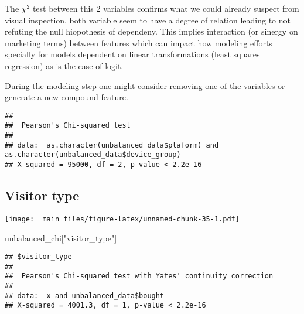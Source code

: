 \documentclass[
]{book}
\newenvironment{Shaded}{\begin{snugshade}}{\end{snugshade}}
\newcommand{\FunctionTok}[1]{\textcolor[rgb]{0.00,0.00,0.00}{#1}}
\newcommand{\NormalTok}[1]{#1}
\newcommand{\SpecialCharTok}[1]{\textcolor[rgb]{0.00,0.00,0.00}{#1}}
\newcommand{\StringTok}[1]{\textcolor[rgb]{0.31,0.60,0.02}{#1}}
\begin{document}
The \(\chi ^2\) test between this 2 variables confirms what we could already suspect from visual inspection, both variable seem to have a degree of relation leading to not refuting the null hiopothesis of dependeny. This implies interaction (or sinergy on marketing terms) between features which can impact how modeling efforts specially for models dependent on linear transformations (least squares regression) as is the case of logit.

During the modeling step one might consider removing one of the variables or generate a new compound feature.

\begin{Shaded}
\end{Shaded}

\begin{verbatim}
## 
##  Pearson's Chi-squared test
## 
## data:  as.character(unbalanced_data$plaform) and as.character(unbalanced_data$device_group)
## X-squared = 95000, df = 2, p-value < 2.2e-16
\end{verbatim}

\hypertarget{visitor-type}{%
\subsection{Visitor type}\label{visitor-type}}

\begin{Shaded}
\end{Shaded}

\texttt{[image: \_main\_files/figure-latex/unnamed-chunk-35-1.pdf]}

\begin{Shaded}
\begin{Highlighting}[]
\NormalTok{unbalanced\_chi[}\StringTok{"visitor\_type"}\NormalTok{]}
\end{Highlighting}
\end{Shaded}

\begin{verbatim}
## $visitor_type
## 
##  Pearson's Chi-squared test with Yates' continuity correction
## 
## data:  x and unbalanced_data$bought
## X-squared = 4001.3, df = 1, p-value < 2.2e-16
\end{verbatim}
\end{document}
